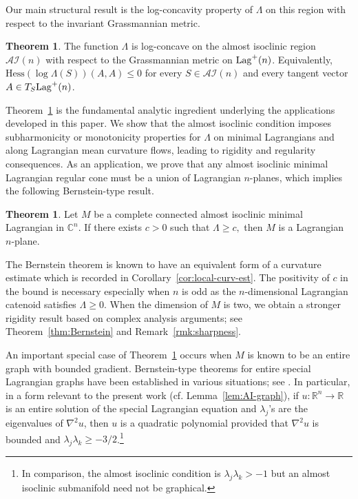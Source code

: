 \documentclass[11pt]{amsart}
\numberwithin{equation}{section}
\theoremstyle{definition}
\newtheorem{thm}[equation]{Theorem} %
\theoremstyle{definition}
\newcommand{\pr}[1]{\left(#1\right)}
\newcommand{\Hess}{\text{Hess}}
\newcommand{\n}{\nabla}
\begin{document}
Our main structural result is the log-concavity property of $\Lambda$ on this region with respect to the invariant Grassmannian metric. 



\begin{thm}
\label{thm:main-thm-log-concavity}
    The function
    $\Lambda$ is log-concave on the almost isoclinic region $\mathcal{AI}(n)$ with respect to the Grassmannian metric on ${\rm Lag}^+(n)$.
    Equivalently, 
    $\Hess\pr{\log \Lambda(S)}(A, A)
    \le 0$
    for every $S\in \mathcal{AI}(n)$ and every tangent vector $A\in T_S{\rm Lag}^+(n)$.
\end{thm}

Theorem~\ref{thm:main-thm-log-concavity} is the fundamental analytic ingredient underlying the applications developed in this paper.
We show that the almost isoclinic condition imposes subharmonicity or monotonicity properties for $\Lambda$ on minimal Lagrangians and along Lagrangian mean curvature flows, leading to rigidity and regularity consequences. 
As an application, we prove that any almost isoclinic minimal Lagrangian regular cone must be a union of Lagrangian $n$-planes, which implies the following Bernstein-type result.


\begin{thm}
	\label{thm:Bernstein-AC}
	Let $M$ be a complete connected almost isoclinic minimal Lagrangian in $\mathbb{C}^n$.
    If there exists $c>0$ such that $\Lambda\ge c,$ then $M$ is a Lagrangian $n$-plane.
\end{thm}


The Bernstein theorem is known to have an equivalent form of a curvature estimate which is recorded in Corollary~\ref{cor:local-curv-est}.
The positivity of $c$ in the bound is necessary especially when $n$ is odd as the $n$-dimensional Lagrangian catenoid satisfies $\Lambda\ge 0.$
When the dimension of $M$ is two, we obtain a stronger rigidity result based on complex analysis arguments; see Theorem~\ref{thm:Bernstein} and Remark~\ref{rmk:sharpness}.



An important special case of Theorem~\ref{thm:Bernstein-AC} occurs when $M$ is known to be an entire graph with bounded gradient.
Bernstein-type theorems for entire special Lagrangian graphs have been established in various situations;
see \cite{Y02,TW02,Y06}.
In particular, in a form relevant to the present work (cf. Lemma~\ref{lem:AI-graph}), if \(u:\mathbb{R}^n\to\mathbb{R}\) is an entire solution of the special Lagrangian equation and \(\lambda_j\)'s are the eigenvalues of \(\n^2 u\), then \(u\) is a quadratic polynomial provided that $\n^2 u$ is bounded and $\lambda_j\lambda_k\geq -3/2$.\footnote{In comparison, the almost isoclinic condition is $\lambda_j\lambda_k>-1$ but an almost isoclinic submanifold need not be graphical.}
\end{document}
